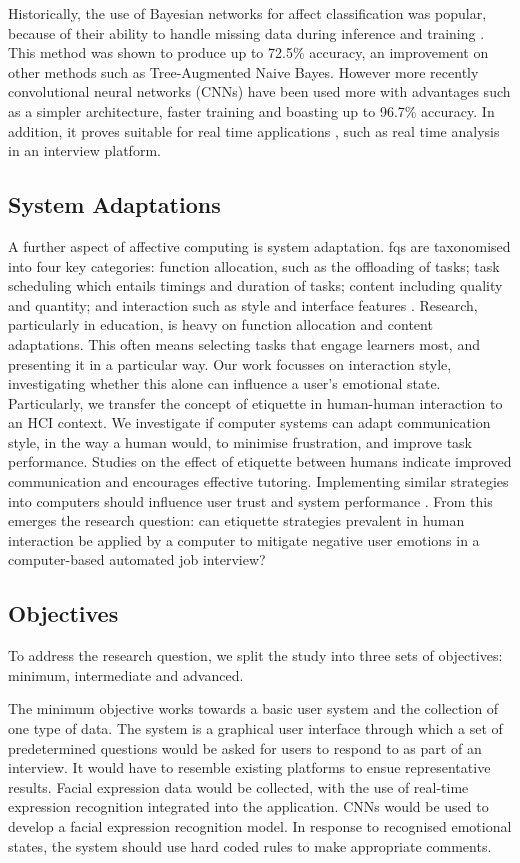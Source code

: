 \documentclass[12pt,a4paper]{article}
\begin{document}
Historically, the use of Bayesian networks for affect classification was popular, because of their ability to handle missing data during inference and training \cite{cohen2003learning}. This method was shown to produce up to 72.5\% accuracy, an improvement on other methods such as Tree-Augmented Naive Bayes. However more recently convolutional neural networks (CNNs) have been used more with advantages such as a simpler architecture, faster training and boasting up to 96.7\% accuracy. In addition, it proves suitable for real time applications \cite{LOPES2017610}, such as real time analysis in an interview platform.

\subsection{System Adaptations}
A further aspect of affective computing is system adaptation. 	fqs are taxonomised into four key categories: function allocation, such as the offloading of tasks; task scheduling which entails timings and duration of tasks; content including quality and quantity; and interaction such as style and interface features \cite{feigh2012toward}. Research, particularly in education, is heavy on function allocation and content adaptations. This often means selecting tasks that engage learners most, and presenting it in a particular way. Our work focusses on interaction style, investigating whether this alone can influence a user's emotional state. Particularly, we transfer the concept of etiquette in human-human interaction to an HCI context. We investigate if computer systems can adapt communication style, in the way a human would, to minimise frustration, and improve task performance. Studies on the effect of etiquette between humans indicate improved communication and encourages effective tutoring. Implementing similar strategies into computers should influence user trust and system performance \cite{parasuraman2004trust}. From this emerges the research question: can etiquette strategies prevalent in human interaction be applied by a computer to mitigate negative user emotions in a computer-based automated job interview?

\subsection{Objectives}
To address the research question, we split the study into three sets of objectives: minimum, intermediate and advanced.

The minimum objective works towards a basic user system and the collection of one type of data. The system is a graphical user interface through which a set of predetermined questions would be asked for users to respond to as part of an interview. It would have to resemble existing platforms to ensue representative results. Facial expression data would be collected, with the use of real-time expression recognition integrated into the application. CNNs would be used to develop a facial expression recognition model. In response to recognised emotional states, the system should use hard coded rules to make appropriate comments.
\end{document}
